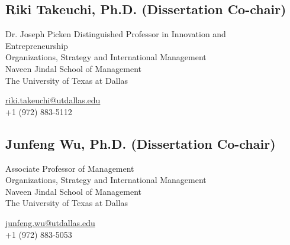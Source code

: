 \documentclass[12pt,letterpaper]{report} %
\begin{document}
    \subsection*{Riki Takeuchi, Ph.D. (Dissertation Co-chair)}
        \begin{minipage}[t]{0.700\textwidth}
        Dr. Joseph Picken Distinguished Professor in Innovation and \\Entrepreneurship\\
        Organizations, Strategy and International Management\\
        Naveen Jindal School of Management\\
        The University of Texas at Dallas
        \end{minipage}
        \begin{minipage}[t]{0.295\textwidth}
        \flushright{}
        \href{mailto:riki.takeuchi@utdallas.edu}{riki.takeuchi@utdallas.edu} \\
        +1 (972) 883-5112
        \end{minipage}
        
    \subsection*{Junfeng Wu, Ph.D. (Dissertation Co-chair)}
        \begin{minipage}[t]{0.700\textwidth}
        Associate Professor of Management \\
        Organizations, Strategy and International Management \\
        Naveen Jindal School of Management \\
        The University of Texas at Dallas
    \end{minipage}
    \begin{minipage}[t]{0.295\textwidth}
        \flushright{}
        \href{mailto:junfeng.wu@utdallas.edu}{junfeng.wu@utdallas.edu} \\
        +1 (972) 883-5053 
    \end{minipage}
\end{document}
